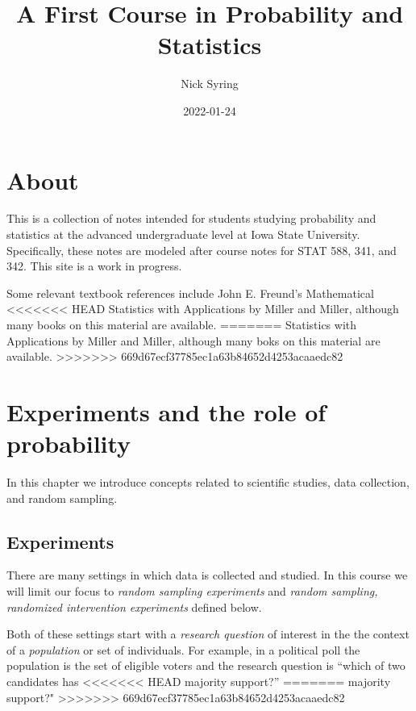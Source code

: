 \documentclass[]{book}
\title{A First Course in Probability and Statistics}
\author{Nick Syring}
\date{2022-01-24}
\begin{document}
\maketitle

{
\setcounter{tocdepth}{1}
\tableofcontents
}
\chapter{About}\label{about}

This is a collection of notes intended for students studying probability
and statistics at the advanced undergraduate level at Iowa State
University. Specifically, these notes are modeled after course notes for
STAT 588, 341, and 342. This site is a work in progress.

Some relevant textbook references include John E. Freund's Mathematical
<<<<<<< HEAD
Statistics with Applications by Miller and Miller, although many books
on this material are available.
=======
Statistics with Applications by Miller and Miller, although many boks on
this material are available.
>>>>>>> 669d67ecf37785ec1a63b84652d4253acaaedc82

\chapter{Experiments and the role of
probability}\label{experiments-and-the-role-of-probability}

In this chapter we introduce concepts related to scientific studies,
data collection, and random sampling.

\section{Experiments}\label{experiments}

There are many settings in which data is collected and studied. In this
course we will limit our focus to \emph{random sampling experiments} and
\emph{random sampling, randomized intervention experiments} defined
below.

Both of these settings start with a \emph{research question} of interest
in the the context of a \emph{population} or set of individuals. For
example, in a political poll the population is the set of eligible
voters and the research question is ``which of two candidates has
<<<<<<< HEAD
majority support?''
=======
majority support?"
>>>>>>> 669d67ecf37785ec1a63b84652d4253acaaedc82
\end{document}

